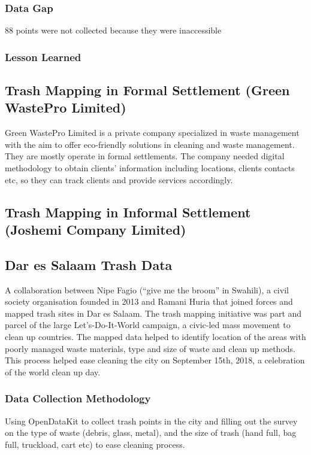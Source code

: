 \documentclass[a4paper,12pt,twoside]{article}
\begin{document}
\subsubsection{Data Gap}
88 points were not collected because they were inaccessible

\subsubsection{Lesson Learned}

\newpage
\subsection{Trash Mapping in Formal Settlement (Green WastePro Limited)}
Green WastePro Limited is a private company specialized in waste management with the aim to offer eco-friendly solutions in cleaning and waste management. They are mostly operate in formal settlements. The company needed digital methodology to obtain clients’ information including locations, clients contacts etc, so they can track clients and provide services accordingly.

\newpage
\subsection{Trash Mapping in Informal Settlement (Joshemi Company Limited)}

\newpage
\subsection{Dar es Salaam Trash Data}

A collaboration between Nipe Fagio (“give me the broom” in Swahili), a civil society organisation founded in 2013 and Ramani Huria that joined forces and mapped trash sites in Dar es Salaam. The trash mapping initiative was part and parcel of the large Let’s-Do-It-World campaign, a civic-led mass movement to clean up countries.
The mapped data helped to identify location of the areas with poorly managed waste materials, type and size of waste and clean up methods. This process helped ease cleaning the city on September 15th, 2018, a celebration of the world clean up day.

\subsubsection{Data Collection Methodology}
Using OpenDataKit to collect trash points in the city and filling out the survey on the type of waste (debris, glass, metal), and the size of trash (hand full, bag full, truckload, cart etc) to ease cleaning process.
\end{document}
